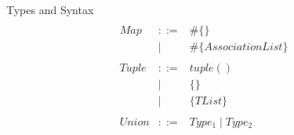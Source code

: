 \documentclass{amsart}
\begin{document}
\begin{section}{Types and Syntax}
\[\begin{array}{lcl}

\\
  Map & ::= & \#\{\}       \\
  & \mid & \#\{AssociationList\} \\
\\
  Tuple & ::= & tuple() \\
  & \mid & \{\} \\ 
  & \mid & \{TList\} \\



\\
  Union & ::=  & Type_1 \mid Type_2
\end{array}
\]  
\end{section}  
\newpage
\end{document}
